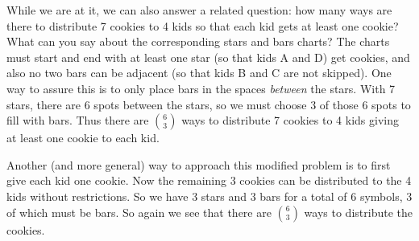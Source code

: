 \documentclass[10pt,]{book}
\theoremstyle{plain}
\theoremstyle{definition}
\theoremstyle{definition}
\theoremstyle{definition}
\numberwithin{equation}{section}
\begin{document}
While we are at it, we can also answer a related question: how many ways are there to distribute 7 cookies to 4 kids so that each kid gets at least one cookie? What can you say about the corresponding stars and bars charts? The charts must start and end with at least one star (so that kids A and D) get cookies, and also no two bars can be adjacent (so that kids B and C are not skipped). One way to assure this is to only place bars in the spaces \emph{between} the stars. With 7 stars, there are 6 spots between the stars, so we must choose 3 of those 6 spots to fill with bars. Thus there are \({6 \choose 3}\) ways to distribute 7 cookies to 4 kids giving at least one cookie to each kid.
%
\par

Another (and more general) way to approach this modified problem is to first give each kid one cookie. Now the remaining 3 cookies can be distributed to the 4 kids without restrictions. So we have 3 stars and 3 bars for a total of 6 symbols, 3 of which must be bars. So again we see that there are \({6 \choose 3}\) ways to distribute the cookies.
%
\par
\end{document}

